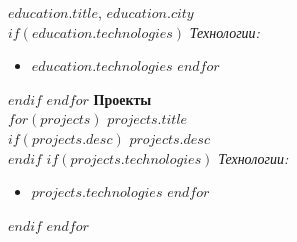 \documentclass[a4paper,10pt]{article}
\begin{document}
    $education.title$, $education.city$ \\
    $if(education.technologies)$
    \textit{Технологии:} \\
    \begin{itemize}
        $for(education.technologies)$
        \item $education.technologies$
        $endfor$
    \end{itemize}
    $endif$
    \vspace{0.2cm}
$endfor$
\textbf{Проекты} \\
$for(projects)$
    \textbf{$projects.title$} \\
    $if(projects.desc)$ $projects.desc$ \\ $endif$
    $if(projects.technologies)$
    \textit{Технологии:} \\
    \begin{itemize}
        $for(projects.technologies)$
        \item $projects.technologies$
        $endfor$
    \end{itemize}
    $endif$
    \vspace{0.2cm}
$endfor$
\end{document}
